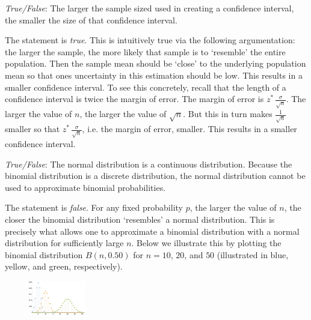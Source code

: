 \documentclass[11pt,letterpaper]{article}
\begin{document}
\quizsol \textit{True/False}: The larger the sample sized used in creating a confidence interval, the smaller the size of that confidence interval. \pspace

\sol The statement is \textit{true}. This is intuitively true via the following argumentation: the larger the sample, the more likely that sample is to `resemble' the entire population. Then the sample mean should be `close' to the underlying population mean so that ones uncertainty in this estimation should be low. This results in a smaller confidence interval. To see this concretely, recall that the length of a confidence interval is twice the margin of error. The margin of error is $z^* \, \frac{\sigma}{\sqrt{n}}$. The larger the value of $n$, the larger the value of $\sqrt{n}$. But this in turn makes $\frac{1}{\sqrt{n}}$ smaller so that $z^* \, \frac{\sigma}{\sqrt{n}}$, i.e. the margin of error, smaller. This results in a smaller confidence interval. \pvspace{1.3cm}



\quizsol \textit{True/False}: The normal distribution is a continuous distribution. Because the binomial distribution is a discrete distribution, the normal distribution cannot be used to approximate binomial probabilities. \pspace

\sol The statement is \textit{false}. For any fixed probability $p$, the larger the value of $n$, the closer the binomial distribution `resembles' a normal distribution. This is precisely what allows one to approximate a binomial distribution with a normal distribution for sufficiently large $n$. Below we illustrate this by plotting the binomial distribution $B(n, 0.50)$ for $n= 10$, $20$, and $50$ (illustrated in blue, yellow, and green, respectively). 
	\begin{figure}[!ht]
	\centering
	\includegraphics[width= 0.22\textwidth]{binomial.png}
	\end{figure}










\newpage
\end{document}
